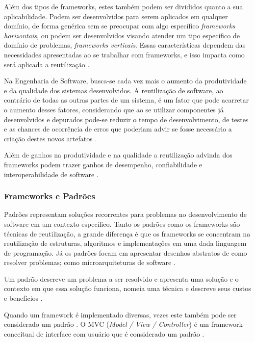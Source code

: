 Além dos tipos de frameworks, estes também podem ser divididos quanto a sua aplicabilidade. Podem ser desenvolvidos para serem aplicados em qualquer domínio, de forma genérica sem se preocupar com algo específico \textit{frameworks horizontais}, ou podem ser desenvolvidos visando atender um tipo específico de domínio de problemas, \textit{frameworks verticais}. Essas características dependem das necessidades apresentadas ao se trabalhar com frameworks, e isso impacta como será aplicada a reutilização \cite{Kroth:2000}.

Na Engenharia de Software, busca-se cada vez mais o aumento da produtividade e da qualidade dos sistemas desenvolvidos. A reutilização de software, ao contrário de todas as outras partes de um sistema, é um fator que pode acarretar o aumento desses fatores, considerando que ao se utilizar componentes já desenvolvidos e depurados pode-se reduzir o tempo de desenvolvimento, de testes e as chances de ocorrência de erros que poderiam advir se fosse necessário a criação destes novos artefatos \cite{Silva:2000}.

Além de ganhos na produtividade e na qualidade a reutilização advinda dos frameworks podem trazer ganhos de desempenho, confiabilidade e interoperabilidade de software \cite{Fayad:Schimidt:1997}.

\subsubsection{Frameworks e Padrões}

Padrões representam soluções recorrentes para problemas no desenvolvimento de software em um contexto específico. Tanto os padrões como os frameworks são técnicas de reutilização, a grande diferença é que os frameworks 	se concentram na reutilização de estruturas, algoritmos e implementações em uma dada linguagem de programação. Já os padrões focam em apresentar desenhos abstratos de como resolver problemas; como microarquiteturas de software \cite{Fayad:Schimidt:1997}.

Um padrão descreve um problema a ser resolvido e apresenta uma solução e o contexto em que essa solução funciona, nomeia uma técnica e descreve seus custos e benefícios \cite{Johnson:1997}.

Quando um framework é implementado diversas, vezes este também pode ser considerado um padrão \cite{Johnson:1997}. O MVC (\textit{Model / View / Controller}) é um framework conceitual de interface com usuário que é considerado um padrão \cite{Almeida:2006}.

